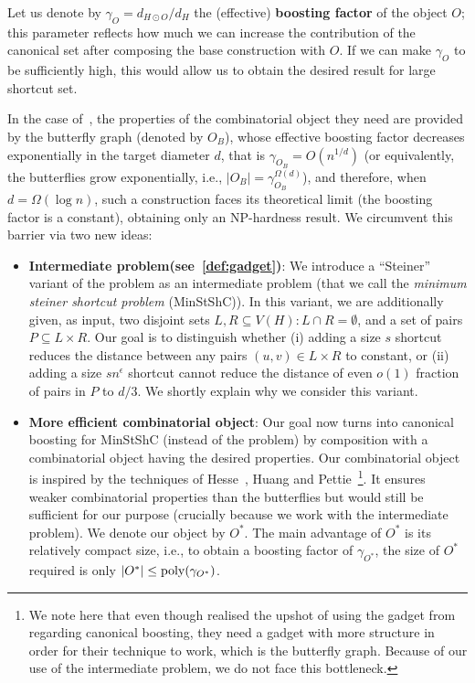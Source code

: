 Let us denote by $\gamma_O = d_{H\odot O}/d_H$ the (effective) \textbf{boosting factor} of the object $O$; this parameter reflects how much we can increase the contribution of the canonical set after composing the base construction with $O$. If we can make $\gamma_O$ to be sufficiently high, this would allow us to obtain the desired result for large shortcut set.  %




In the case of~\cite{BhattacharyyaGJRW12}, the properties of the combinatorial object they need are provided by the butterfly graph (denoted by $O_B$), whose effective boosting factor decreases exponentially in the target diameter $d$, that is $\gamma_{O_B} = O(n^{1/d})$ (or equivalently, the butterflies grow exponentially, i.e., $|O_B|=\gamma_{O_B}^{\Omega(d)}$), and therefore, when $d = \Omega(\log n)$, such a construction faces its theoretical limit (the boosting factor is a constant), obtaining only an NP-hardness result. We circumvent this barrier via two new ideas: 

\begin{itemize}
    
    \item \textbf{Intermediate problem(see~\cref{def:gadget})}: We introduce a ``Steiner'' variant of the \os{} problem as an intermediate problem (that we call the \textit{minimum steiner shortcut problem} ({\sf MinStShC})). In this variant, we are additionally given, as input, two disjoint sets $L, R \subseteq V(H): L \cap R = \emptyset$, and a set of pairs $P\subseteq L\times R$. Our goal is to distinguish whether (i) adding a size $s$ shortcut reduces the distance between any pairs $(u,v) \in L \times R$ to constant, or (ii) adding a size $sn^{\epsilon}$ shortcut cannot reduce the distance of even $o(1)$ fraction of pairs in $P$ to $d/3$. We shortly explain why we consider this variant.



    \item \textbf{More efficient combinatorial object}: Our goal now turns into canonical boosting for {\sf MinStShC} (instead of the \os{} problem) by composition with a combinatorial object having the desired properties. Our combinatorial object is inspired by the techniques of Hesse~\cite{Hesse03}, Huang and Pettie~\cite{HuangP21}\footnote{We note here that even though \cite{BhattacharyyaGJRW12} realised the upshot of using the gadget from \cite{Hesse03} regarding canonical boosting, they need a gadget with more structure in order for their technique to work, which is the butterfly graph. Because of our use of the intermediate problem, we do not face this bottleneck.}. It ensures weaker combinatorial properties than the butterflies but would still be sufficient for our purpose (crucially because we work with the intermediate problem). We denote our object by $O^*$. The main advantage of $O^*$ is its relatively compact size, i.e., to obtain a boosting factor of $\gamma_{O^*}$, the size of $O^*$ required is only $|O^*| \leq {\rm poly}(\gamma_{O^*})$. %

\end{itemize}

